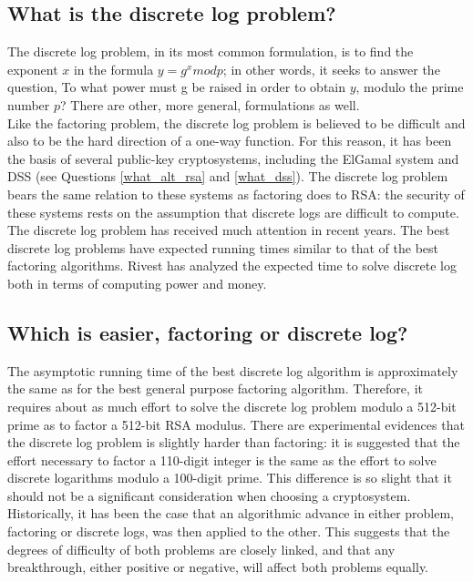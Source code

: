 \subsection{What is the discrete log problem?}
\label{what_log_pb}

The discrete log problem, in its most common formulation, is to find
the exponent $x$ in the formula $y=g^x mod p$; in other words, it seeks to
answer the question, To what power must g be raised in order to obtain
$y$, modulo the prime number $p$? There are other, more general,
formulations as well.\\

Like the factoring problem, the discrete log problem is believed to be
difficult and also to be the hard direction of a one-way function. For this
reason, it has been the basis of several public-key cryptosystems,
including the ElGamal system and DSS (see Questions \ref{what_alt_rsa} and
\ref{what_dss}). The discrete log problem bears the same relation to these
systems as factoring does to RSA: the security of these systems rests on
the assumption that discrete logs are difficult to compute.\\

The discrete log problem has received much attention in recent years.
The best discrete log problems have expected running times similar to
that of the best factoring algorithms. Rivest has analyzed the expected
time to solve discrete log both in terms of computing power and money.

\subsection{Which is easier, factoring or discrete log?}

The asymptotic running time of the best discrete log algorithm is
approximately the same as for the best general purpose factoring
algorithm. Therefore, it requires about as much effort to solve the
discrete log problem modulo a 512-bit prime as to factor a 512-bit RSA
modulus. There are experimental evidences that the discrete log problem
is slightly harder than factoring: it is suggested that the effort
necessary to factor a 110-digit integer is the same as the effort to
solve discrete logarithms modulo a 100-digit prime. This difference is
so slight that it should not be a significant consideration when
choosing a cryptosystem.\\

Historically, it has been the case that an algorithmic advance in
either problem, factoring or discrete logs, was then applied to the
other. This suggests that the degrees of difficulty of both problems
are closely linked, and that any breakthrough, either positive or
negative, will affect both problems equally.


